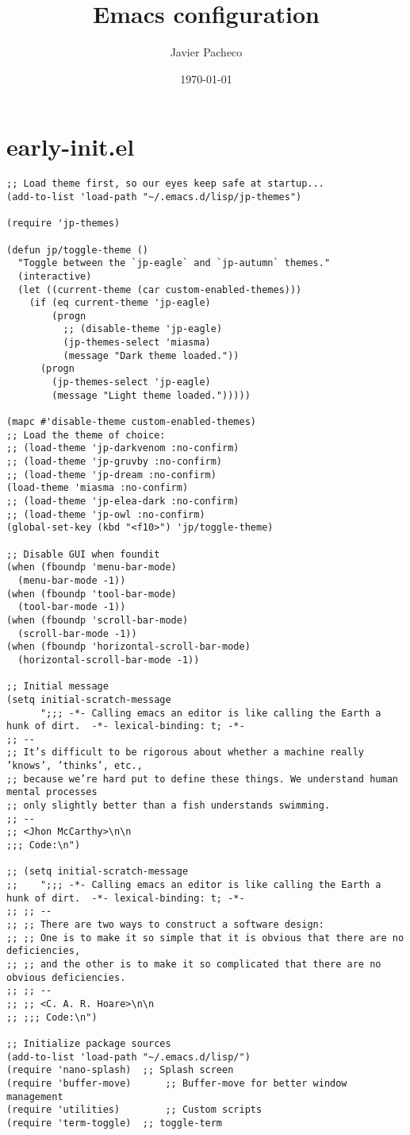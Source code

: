 \documentclass[11pt]{article}
\author{Javier Pacheco}
\date{\today}
\title{Emacs configuration}
\begin{document}
\maketitle
\tableofcontents


\section{early-init.el}
\label{sec:org991db2a}
\begin{verbatim}
;; Load theme first, so our eyes keep safe at startup...
(add-to-list 'load-path "~/.emacs.d/lisp/jp-themes")

(require 'jp-themes)

(defun jp/toggle-theme ()
  "Toggle between the `jp-eagle` and `jp-autumn` themes."
  (interactive)
  (let ((current-theme (car custom-enabled-themes)))
    (if (eq current-theme 'jp-eagle)
        (progn
          ;; (disable-theme 'jp-eagle)
          (jp-themes-select 'miasma)
          (message "Dark theme loaded."))
      (progn
        (jp-themes-select 'jp-eagle)
        (message "Light theme loaded.")))))

(mapc #'disable-theme custom-enabled-themes)
;; Load the theme of choice:
;; (load-theme 'jp-darkvenom :no-confirm)
;; (load-theme 'jp-gruvby :no-confirm)
;; (load-theme 'jp-dream :no-confirm)
(load-theme 'miasma :no-confirm)
;; (load-theme 'jp-elea-dark :no-confirm)
;; (load-theme 'jp-owl :no-confirm)
(global-set-key (kbd "<f10>") 'jp/toggle-theme)

;; Disable GUI when foundit
(when (fboundp 'menu-bar-mode)
  (menu-bar-mode -1))
(when (fboundp 'tool-bar-mode)
  (tool-bar-mode -1))
(when (fboundp 'scroll-bar-mode)
  (scroll-bar-mode -1))
(when (fboundp 'horizontal-scroll-bar-mode)
  (horizontal-scroll-bar-mode -1))

;; Initial message
(setq initial-scratch-message
      ";;; -*- Calling emacs an editor is like calling the Earth a hunk of dirt.  -*- lexical-binding: t; -*-
;; --
;; It’s difficult to be rigorous about whether a machine really ’knows’, ’thinks’, etc.,
;; because we’re hard put to define these things. We understand human mental processes
;; only slightly better than a fish understands swimming.
;; --
;; <Jhon McCarthy>\n\n
;;; Code:\n")

;; (setq initial-scratch-message
;; 	  ";;; -*- Calling emacs an editor is like calling the Earth a hunk of dirt.  -*- lexical-binding: t; -*-
;; ;; --
;; ;; There are two ways to construct a software design:
;; ;; One is to make it so simple that it is obvious that there are no deficiencies,
;; ;; and the other is to make it so complicated that there are no obvious deficiencies.
;; ;; --
;; ;; <C. A. R. Hoare>\n\n
;; ;;; Code:\n")

;; Initialize package sources
(add-to-list 'load-path "~/.emacs.d/lisp/")
(require 'nano-splash)	;; Splash screen
(require 'buffer-move)   	;; Buffer-move for better window management
(require 'utilities)		;; Custom scripts
(require 'term-toggle)	;; toggle-term

\end{verbatim}
\end{document}
